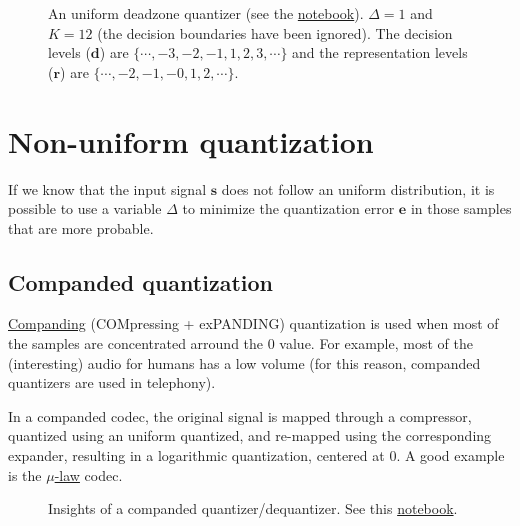\begin{figure}
  \caption{An uniform deadzone quantizer (see the
    \href{https://nbviewer.jupyter.org/github/vicente-gonzalez-ruiz/scalar_quantization/blob/master/graphics/deadzone.ipynb}{notebook}). $\Delta=1$
    and $K=12$ (the decision boundaries have been ignored). The
    decision levels (${\mathbf d}$) are
    $\{\cdots,-3,-2,-1,1,2,3,\cdots\}$ and the representation levels
    (${\mathbf r}$) are $\{\cdots,-2,-1,-0,1,2,\cdots\}$.}
  \label{fig:deadzone}
\end{figure}

\section{Non-uniform quantization}

If we know that the input signal ${\mathbf s}$ does not follow an
uniform distribution, it is possible to use a variable $\Delta$ to
minimize the quantization error ${\mathbf e}$ in those
samples that are more probable.


\subsection{Companded quantization~\cite{sayood2017introduction}}

\href{https://en.wikipedia.org/wiki/Companding}{Companding}
(COMpressing + exPANDING) quantization is used when most of the
samples are concentrated arround the $0$ value. For example, most of
the (interesting) audio for humans has a low volume (for this reason,
companded quantizers are used in telephony).

In a companded codec, the original signal is mapped through a
compressor, quantized using an uniform quantized, and re-mapped using
the corresponding expander, resulting in a logarithmic quantization,
centered at $0$. A good example is the
\href{https://en.wikipedia.org/wiki/\%CE\%9C-law_algorithm}{\(\mu\)-law}
codec.

\begin{figure}
  \centering
  \caption{Insights of a companded quantizer/dequantizer. See this
    \href{https://nbviewer.jupyter.org/github/vicente-gonzalez-ruiz/scalar_quantization/blob/master/graphics/companded_quantization.ipynb}{notebook}.}
  \label{fig:companded_quantizer}
\end{figure}

